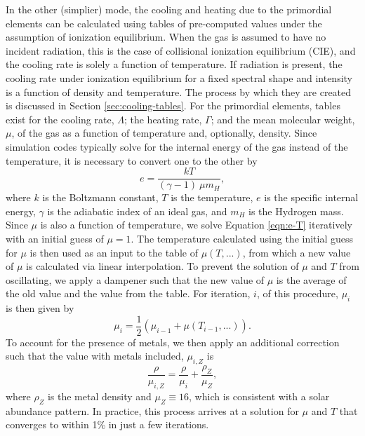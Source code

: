 In the other (simplier) mode, the cooling and heating due to the primordial
elements can be calculated using tables of pre-computed values under
the assumption of ionization equilibrium.  When the gas is assumed to
have no incident radiation, this is the case of collisional ionization
equilibrium (CIE), and the cooling rate is solely a function of
temperature.  If radiation is present, the cooling rate under
ionization equilibrium for a fixed spectral shape and intensity is a
function of density and temperature.  The process by which they are
created is discussed in Section \ref{sec:cooling-tables}.  For the
primordial elements, tables exist for the cooling rate, $\Lambda$;
the heating rate, $\Gamma$; and the mean molecular weight, $\mu$, of
the gas as a function of temperature and, optionally, density.  Since
simulation codes typically solve for the internal energy of the gas
instead of the temperature, it is necessary to convert one to the
other by
\begin{equation} \label{eqn:e-T}
e = \frac{k T}{(\gamma - 1)\ \mu m_{H}},
\end{equation}
where $k$ is the Boltzmann constant, $T$ is the temperature, $e$ is
the specific internal energy, $\gamma$ is the adiabatic index of an
ideal gas, and $m_{H}$ is the Hydrogen mass.  Since $\mu$ is also a
function of temperature, we solve Equation \ref{eqn:e-T} iteratively
with an initial guess of $\mu = 1$.  The temperature calculated using
the initial guess for $\mu$ is then used as an input to the table of
$\mu(T,...)$, from which a new value of $\mu$ is calculated via
linear interpolation.  To prevent the solution of $\mu$ and $T$ from
oscillating, we apply a dampener such that the new value of $\mu$ is
the average of the old value and the value from the table.  For
iteration, $i$, of this procedure, $\mu_{i}$ is then given by
\begin{equation}
\mu_{i} = \frac{1}{2} (\mu_{i-1} + \mu(T_{i-1},...)).
\end{equation}
To account for the presence of metals, we then apply an additional
correction such that the value with metals included, $\mu_{i, Z}$ is
\begin{equation}
\frac{\rho}{\mu_{i, Z}} = \frac{\rho}{\mu_{i}} +
\frac{\rho_{Z}}{\mu_{Z}},
\end{equation}
where $\rho_{Z}$ is the metal density and $\mu_{Z} \equiv 16$, which
is consistent with a solar abundance pattern.  In practice, this
process arrives at a solution for $\mu$ and $T$ that converges to
within 1\% in just a few iterations.

